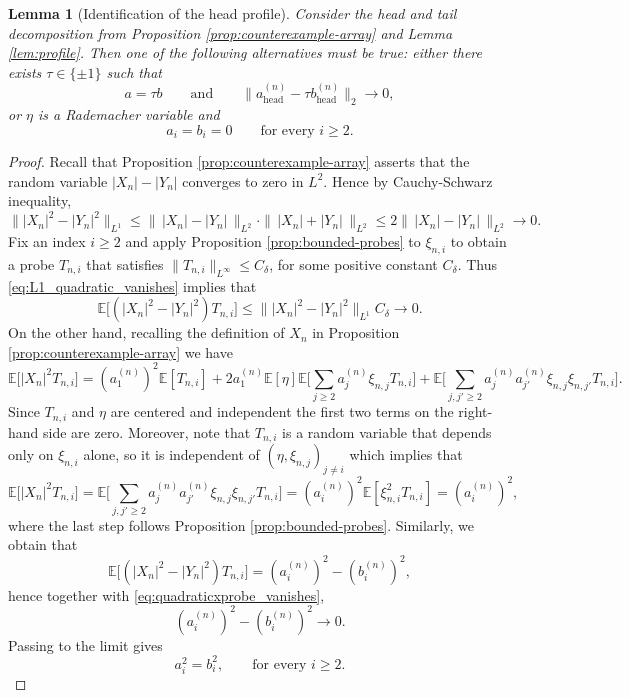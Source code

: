 \documentclass[11pt]{amsart}
\newtheorem{lemma}[theorem]{Lemma}
\newcommand{\E}{\mathbb E}
\begin{document}
\begin{lemma}[Identification of the head profile]\label{lem:head-sign}
Consider the head and tail decomposition from Proposition \ref{prop:counterexample-array} and Lemma \ref{lem:profile}. Then one of the following alternatives must be true:
either there exists $\tau \in \{\pm 1\}$ such that
\[
a = \tau b
\qquad
\text{and}
\qquad
\|a^{(n)}_{\mathrm{head}} - \tau b^{(n)}_{\mathrm{head}}\|_2 \longrightarrow 0,
\]
or  $\eta$ is a Rademacher variable and
\[
a_i=b_i=0
\qquad
\text{for every } i \ge 2.
\]
\end{lemma}

\begin{proof}
Recall that Proposition \ref{prop:counterexample-array} asserts that the random variable $|X_n|-|Y_n|$ converges to zero in $L^2$. Hence by Cauchy-Schwarz inequality,
\begin{equation}
\label{eq:L1_quadratic_vanishes}
\bigl\| |X_n|^2 - |Y_n|^2 \bigr\|_{L^1}
\le
\|\, |X_n|-|Y_n| \,\|_{L^2}
\cdot
\|\, |X_n|+|Y_n| \,\|_{L^2}
\le
2 \|\, |X_n|-|Y_n| \,\|_{L^2}
\longrightarrow 0.
\end{equation}
Fix an index $i \ge 2$ and apply Proposition \ref{prop:bounded-probes} to $\xi_{n,i}$ to obtain a probe $T_{n,i}$ that satisfies $\|T_{n,i}\|_{L^\infty} \le
C_\delta$, for some positive constant $C_{\delta}$. Thus \eqref{eq:L1_quadratic_vanishes} implies that
\begin{equation}
\label{eq:quadraticxprobe_vanishes}
\E\bigl[(|X_n|^2-|Y_n|^2) T_{n,i}\bigr] \le \bigl\| |X_n|^2 - |Y_n|^2 \bigr\|_{L^1}C_{\delta} \longrightarrow 0 .
\end{equation}
On the other hand, recalling the definition of $X_n$ in Proposition \ref{prop:counterexample-array} we have
\begin{equation*}
\E\bigl[|X_n|^2 T_{n,i}\bigr] = (a_1^{(n)})^2\E[T_{n,i}] + 2a_1^{(n)}\E[\eta] \E\big[\sum_{j\ge 2}a_j^{(n)}\xi_{n,j}T_{n,i}\big] + \E\big[\sum_{j,j'\ge 2}a_j^{(n)}a_{j'}^{(n)}\xi_{n,j}\xi_{n,j'}T_{n,i}\big].
\end{equation*}
Since $T_{n,i}$ and $\eta$ are centered and independent the first two terms on the right-hand side are zero. Moreover, note that $T_{n,i}$ is a random variable that depends only on $\xi_{n,i}$ alone, so it is independent of
$(\eta,\xi_{n,j})_{j \ne i}$ which implies that 
\begin{equation*}
\E\bigl[|X_n|^2 T_{n,i}\bigr] =  \E\big[\sum_{j,j'\ge 2}a_j^{(n)}a_{j'}^{(n)}\xi_{n,j}\xi_{n,j'}T_{n,i}\big] = (a_i^{(n)})^2\E[\xi_{n,i}^2T_{n,i}] =(a_i^{(n)})^2,
\end{equation*}
where the last step follows Proposition \ref{prop:bounded-probes}. Similarly, we obtain that
\[
\E\bigl[(|X_n|^2-|Y_n|^2) T_{n,i}\bigr]
=
(a_i^{(n)})^2 - (b_i^{(n)})^2,
\]
hence together with \eqref{eq:quadraticxprobe_vanishes},
\[
(a_i^{(n)})^2 - (b_i^{(n)})^2 \longrightarrow 0.
\]
Passing to the limit gives
\begin{equation}
\label{eq:squared_good}
a_i^2 = b_i^2,
\qquad
\text{for every } i \ge 2.
\end{equation}



\end{proof}
\end{document}
